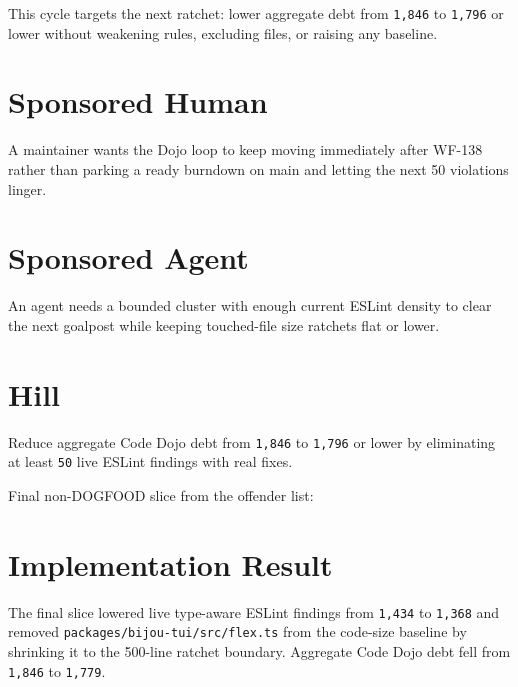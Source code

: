This cycle targets the next ratchet: lower aggregate debt from \texttt{1\allowbreak{},\allowbreak{}8\allowbreak{}4\allowbreak{}6} to \texttt{1\allowbreak{},\allowbreak{}7\allowbreak{}9\allowbreak{}6} or lower without weakening rules, excluding files, or raising any baseline.

\section{Sponsored Human}\label{record-221-sponsored-human}

A maintainer wants the Dojo loop to keep moving immediately after WF-138 rather than parking a ready burndown on main and letting the next 50 violations linger.

\section{Sponsored Agent}\label{record-221-sponsored-agent}

An agent needs a bounded cluster with enough current ESLint density to clear the next goalpost while keeping touched-file size ratchets flat or lower.

\section{Hill}\label{record-221-hill}

Reduce aggregate Code Dojo debt from \texttt{1\allowbreak{},\allowbreak{}8\allowbreak{}4\allowbreak{}6} to \texttt{1\allowbreak{},\allowbreak{}7\allowbreak{}9\allowbreak{}6} or lower by eliminating at least \texttt{5\allowbreak{}0} live ESLint findings with real fixes.

Final non-DOGFOOD slice from the offender list:



\section{Implementation Result}\label{record-221-implementation-result}

The final slice lowered live type-aware ESLint findings from \texttt{1\allowbreak{},\allowbreak{}4\allowbreak{}3\allowbreak{}4} to \texttt{1\allowbreak{},\allowbreak{}3\allowbreak{}6\allowbreak{}8} and removed \texttt{p\allowbreak{}a\allowbreak{}c\allowbreak{}k\allowbreak{}a\allowbreak{}g\allowbreak{}e\allowbreak{}s\allowbreak{}/\allowbreak{}b\allowbreak{}i\allowbreak{}j\allowbreak{}o\allowbreak{}u\allowbreak{}-\allowbreak{}t\allowbreak{}u\allowbreak{}i\allowbreak{}/\allowbreak{}s\allowbreak{}r\allowbreak{}c\allowbreak{}/\allowbreak{}f\allowbreak{}l\allowbreak{}e\allowbreak{}x\allowbreak{}.\allowbreak{}t\allowbreak{}s} from the code-size baseline by shrinking it to the 500-line ratchet boundary. Aggregate Code Dojo debt fell from \texttt{1\allowbreak{},\allowbreak{}8\allowbreak{}4\allowbreak{}6} to \texttt{1\allowbreak{},\allowbreak{}7\allowbreak{}7\allowbreak{}9}.

